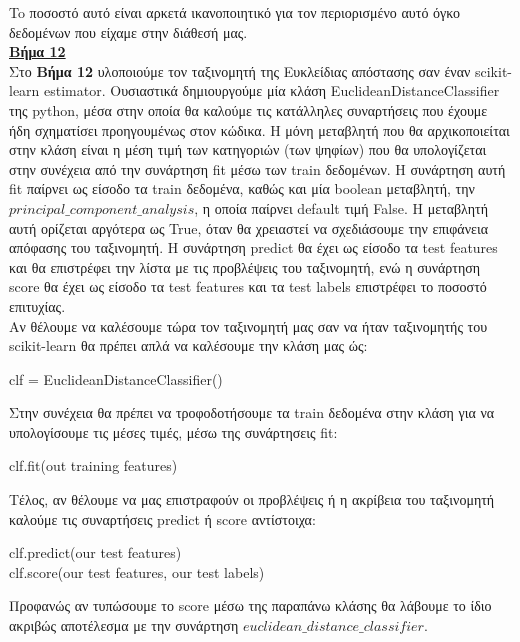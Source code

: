 \documentclass[11pt]{article} %
\begin{document}
To ποσοστό αυτό είναι αρκετά ικανοποιητικό για τον περιορισμένο αυτό όγκο δεδομένων που είχαμε στην διάθεσή μας.\\

\underline{\textbf{Βήμα 12}}\\

Στο \textbf{Βήμα 12} υλοποιούμε τον ταξινομητή της Ευκλείδιας απόστασης σαν έναν scikit-learn estimator. Ουσιαστικά δημιουργούμε μία κλάση EuclideanDistanceClassifier της python, μέσα στην οποία θα καλούμε τις κατάλληλες συναρτήσεις που έχουμε ήδη σχηματίσει προηγουμένως στον κώδικα. Η μόνη μεταβλητή που θα αρχικοποιείται στην κλάση είναι η μέση τιμή των κατηγοριών (των ψηφίων) που θα υπολογίζεται στην συνέχεια από την συνάρτηση fit μέσω των train δεδομένων. Η συνάρτηση αυτή fit παίρνει ως είσοδο τα train δεδομένα, καθώς και μία boolean μεταβλητή, την $principal\_component\_analysis$, η οποία παίρνει default τιμή False. Η μεταβλητή αυτή ορίζεται αργότερα ως True, όταν θα χρειαστεί να σχεδιάσουμε την επιφάνεια απόφασης του ταξινομητή. Η συνάρτηση predict θα έχει ως είσοδο τα test features και θα επιστρέφει την λίστα με τις προβλέψεις του ταξινομητή, ενώ η συνάρτηση score θα έχει ως είσοδο τα test features και τα test labels επιστρέφει το ποσοστό επιτυχίας.\\

Αν θέλουμε να καλέσουμε τώρα τον ταξινομητή μας σαν να ήταν ταξινομητής του scikit-learn θα πρέπει απλά να καλέσουμε την κλάση μας ώς:
\begin{center}
clf  = EuclideanDistanceClassifier()
\end{center}

Στην συνέχεια θα πρέπει να τροφοδοτήσουμε τα train δεδομένα στην κλάση για να υπολογίσουμε τις μέσες τιμές, μέσω της συνάρτησεις fit:
\begin{center}
clf.fit(out training features)
\end{center}

Τέλος, αν θέλουμε να μας επιστραφούν οι προβλέψεις ή η ακρίβεια του ταξινομητή καλούμε τις συναρτήσεις predict ή score αντίστοιχα:
\begin{center}
clf.predict(our test features)\\
clf.score(our test features, our test labels)
\end{center}

Προφανώς αν τυπώσουμε το score μέσω της παραπάνω κλάσης θα λάβουμε το ίδιο ακριβώς αποτέλεσμα με την συνάρτηση $euclidean\_distance\_classifier$.\\
\end{document}
